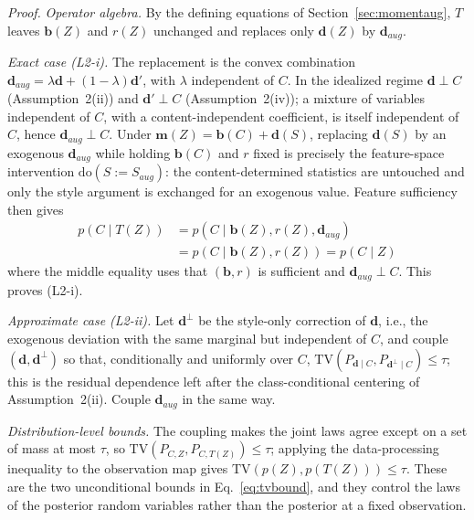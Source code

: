 \documentclass[electronics,article,submit,moreauthors]{Definitions/mdpi}
\begin{document}
\noindent\textit{Proof.}
\emph{Operator algebra.} By the defining equations of Section~\ref{sec:momentaug}, $T$ leaves $\mathbf{b}(Z)$ and $r(Z)$ unchanged and replaces only $\mathbf{d}(Z)$ by $\mathbf{d}_{aug}$.

\emph{Exact case (L2-i).} The replacement is the convex combination $\mathbf{d}_{aug}=\lambda\mathbf{d}+(1-\lambda)\mathbf{d}'$, with $\lambda$ independent of $C$. In the idealized regime $\mathbf{d}\perp C$ (Assumption~2(ii)) and $\mathbf{d}'\perp C$ (Assumption~2(iv)); a mixture of variables independent of $C$, with a content-independent coefficient, is itself independent of $C$, hence $\mathbf{d}_{aug}\perp C$. Under $\mathbf{m}(Z)=\mathbf{b}(C)+\mathbf{d}(S)$, replacing $\mathbf{d}(S)$ by an exogenous $\mathbf{d}_{aug}$ while holding $\mathbf{b}(C)$ and $r$ fixed is precisely the feature-space intervention $\mathrm{do}(S\!:=\!S_{aug})$: the content-determined statistics are untouched and only the style argument is exchanged for an exogenous value. Feature sufficiency then gives
\begin{equation*}
\begin{aligned}
p(C\mid T(Z))&=p\!\left(C\mid \mathbf{b}(Z),r(Z),\mathbf{d}_{aug}\right)\\
&=p\!\left(C\mid \mathbf{b}(Z),r(Z)\right)=p(C\mid Z)
\end{aligned}
\end{equation*}
where the middle equality uses that $(\mathbf{b},r)$ is sufficient and $\mathbf{d}_{aug}\perp C$. This proves (L2-i).

\emph{Approximate case (L2-ii).} Let $\mathbf{d}^{\perp}$ be the style-only correction of $\mathbf{d}$, i.e., the exogenous deviation with the same marginal but independent of $C$, and couple $(\mathbf{d},\mathbf{d}^{\perp})$ so that, conditionally and uniformly over $C$, $\mathrm{TV}(P_{\mathbf{d}\mid C},P_{\mathbf{d}^{\perp}\mid C})\le\tau$; this is the residual dependence left after the class-conditional centering of Assumption~2(ii). Couple $\mathbf{d}_{aug}$ in the same way.

\emph{Distribution-level bounds.} The coupling makes the joint laws agree except on a set of mass at most $\tau$, so $\mathrm{TV}(P_{C,Z},P_{C,T(Z)})\le\tau$; applying the data-processing inequality to the observation map gives $\mathrm{TV}(p(Z),p(T(Z)))\le\tau$. These are the two unconditional bounds in Eq.~\eqref{eq:tvbound}, and they control the laws of the posterior random variables rather than the posterior at a fixed observation.
\end{document}
